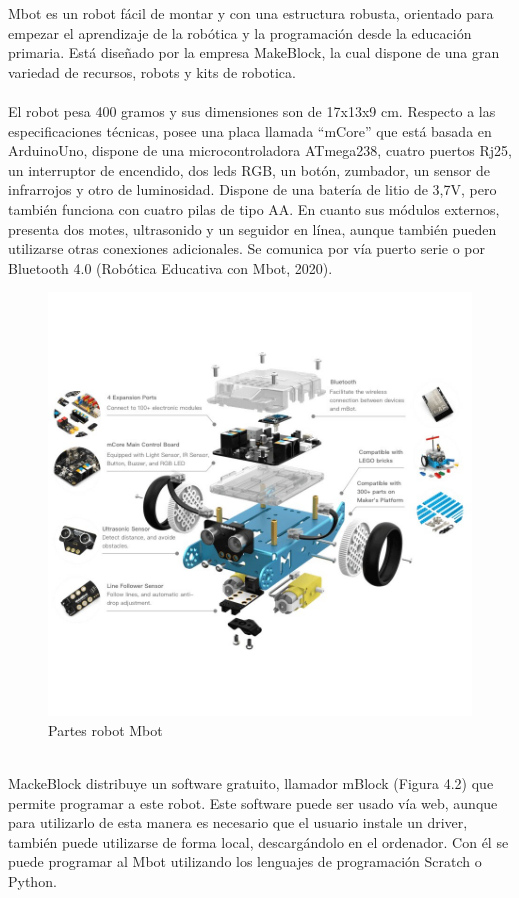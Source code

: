\documentclass{report}
\begin{document}
Mbot es un robot fácil de montar y con una estructura robusta, orientado para empezar el aprendizaje de la robótica y la programación desde la educación primaria. Está diseñado por la empresa MakeBlock, la cual dispone de una gran variedad de recursos, robots y kits de robotica.
\\
\\
El robot pesa 400 gramos y sus dimensiones son de 17x13x9 cm. Respecto a las especificaciones técnicas, posee una placa llamada “mCore” que está basada en ArduinoUno, dispone de una microcontroladora ATmega238, cuatro puertos Rj25, un interruptor de encendido, dos leds RGB, un botón, zumbador, un sensor de infrarrojos y otro de luminosidad. Dispone de una batería de litio de 3,7V, pero también funciona con cuatro pilas de tipo AA. En cuanto  sus módulos externos, presenta dos motes, ultrasonido y un seguidor en línea, aunque también pueden utilizarse otras conexiones adicionales. Se comunica por vía puerto serie o por Bluetooth 4.0 (Robótica Educativa con Mbot, 2020).
\\
\begin{figure}[h!]
  \centering
    \includegraphics[width=1\textwidth]{images/partes_mbot.png}
  \caption{Partes robot Mbot}
  \label{figura:Partes robot Mbot}
\end{figure}
\\
MackeBlock distribuye un software gratuito, llamador mBlock (Figura 4.2) que permite programar a este robot. Este software puede ser usado vía web, aunque para utilizarlo de esta manera es necesario que el usuario instale un driver, también puede utilizarse de forma local, descargándolo en el ordenador. Con él se puede programar al Mbot utilizando los lenguajes de programación Scratch o Python.
\end{document}
